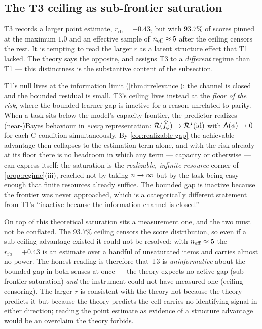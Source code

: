 \subsection{The T3 ceiling as sub-frontier saturation}
\label{subsec:anchor-t3}

T3 records a larger point estimate, $r_{\mathrm{rb}}=+0.43$, but with
$93.7\%$ of scores pinned at the maximum $1.0$ and an effective sample of
$n_{\mathrm{eff}}\approx 5$ after the ceiling censors the rest. It is
tempting to read the larger $r$ as a latent structure effect that T1 lacked.
The theory says the opposite, and assigns T3 to a \emph{different} regime than
T1 --- this distinctness is the substantive content of the subsection.

T1's null lives at the information limit (\cref{thm:irrelevance}): the channel
is closed and the bounded residual is small. T3's ceiling lives instead at the
\emph{floor of the risk}, where the bounded-learner gap is inactive for a reason
unrelated to parity. When a task sits below the model's capacity frontier, the
predictor realizes (near-)Bayes behaviour in \emph{every} representation:
$\mathcal{R}(\widehat f_{\phi})\to\mathcal{R}^{\star}(\mathrm{id})$ with
$\mathsf{A}(\phi)\to 0$ for each C-condition simultaneously. By
\cref{cor:realizable-gap} the achievable advantage then collapses to the
estimation term alone, and with the risk already at its floor there is no
headroom in which any term --- capacity or otherwise --- can express itself: the
saturation is the \emph{realizable, infinite-resource} corner of
\cref{prop:regime}(iii), reached not by taking $n\to\infty$ but by the
task being easy enough that finite resources already suffice. The bounded gap is
inactive because the frontier was never approached, which is a categorically
different statement from T1's ``inactive because the information channel is
closed.''

On top of this theoretical saturation sits a measurement one, and the two must
not be conflated. The $93.7\%$ ceiling censors the score distribution, so even
if a sub-ceiling advantage existed it could not be resolved: with
$n_{\mathrm{eff}}\approx 5$ the $r_{\mathrm{rb}}=+0.43$ is an estimate
over a handful of unsaturated items and carries almost no power. The honest
reading is therefore that T3 is \emph{uninformative} about the bounded gap in
both senses at once --- the theory expects no active gap (sub-frontier
saturation) \emph{and} the instrument could not have measured one (ceiling
censoring). The larger $r$ is consistent with the theory not because the theory
predicts it but because the theory predicts the cell carries no identifying
signal in either direction; reading the point estimate as evidence of a
structure advantage would be an overclaim the theory forbids.

